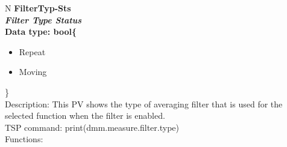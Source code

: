 \documentclass[openany]{article}
\begin{document}
		\begin{tabular}{N}
			\hline
			\bfseries FilterTyp-Sts\label{pv:filtertyp-sts} \\ \hline
			\emph{Filter Type Status} \\
			Data type: bool\{\begin{itemize}[noitemsep]
				\item[] Repeat
				\item[] Moving
			\end{itemize}\} \\
			Description: This PV shows the type of averaging filter that is used for the selected function when the filter is enabled. \\
			TSP command: print(dmm.measure.filter.type) \\
			Functions: \\
			\arrayrulecolor{\FuncTableBorderColor}

		\end{tabular}
\end{document}
